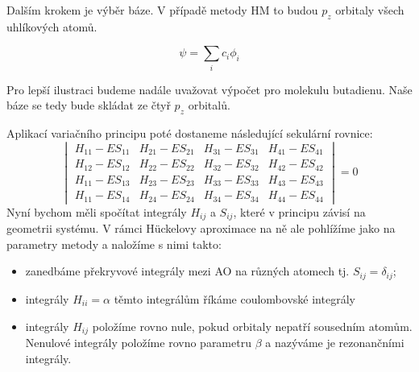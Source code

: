 Dalším krokem je výběr báze. V případě metody HM to budou $p_z$ orbitaly všech uhlíkových atomů.

\begin{equation}
\psi= \sum_i c_i \phi_i
\end{equation}

Pro lepší ilustraci budeme nadále uvažovat výpočet pro molekulu butadienu.
Naše báze se tedy bude skládat ze čtyř $p_z$ orbitalů.

Aplikací variačního principu poté dostaneme následující sekulární rovnice:
\begin{equation}
\begin{vmatrix}
H_{11}-ES_{11} & H_{21}-ES_{21} & H_{31}-ES_{31} & H_{41}-ES_{41}  \\
H_{12}-ES_{12} & H_{22}-ES_{22} & H_{32}-ES_{32} & H_{42}-ES_{42}  \\
H_{11}-ES_{13} & H_{23}-ES_{23} & H_{33}-ES_{33} & H_{43}-ES_{43}  \\
H_{11}-ES_{14} & H_{24}-ES_{24} & H_{34}-ES_{34} & H_{44}-ES_{44}
\end{vmatrix}
= 0
\end{equation}
Nyní bychom měli spočítat integrály $H_{ij}$ a $S_{ij}$, které v principu závisí na geometrii systému.
V rámci H\"{u}ckelovy aproximace na ně ale pohlížíme jako na parametry metody
a naložíme s nimi takto:
\begin{itemize}
\item zanedbáme překryvové integrály mezi AO na různých atomech tj. $S_{ij}=\delta_{ij}$;
\item integrály $H_{ii}=\alpha$ těmto integrálům říkáme coulombovské integrály
\item integrály $H_{ij}$ položíme rovno nule, pokud orbitaly nepatří sousedním atomům.
Nenulové integrály položíme rovno parametru $\beta$ a nazýváme je rezonančními integrály.
\end{itemize}

